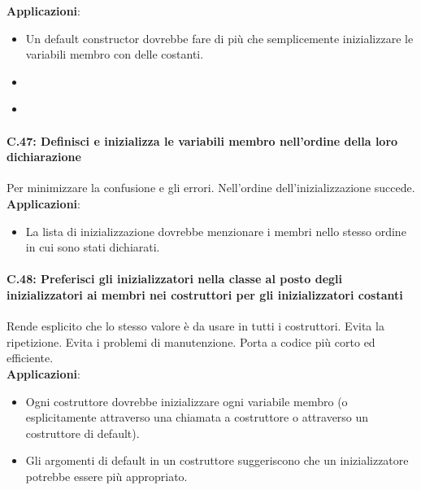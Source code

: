 \textsf{\small \textbf{Applicazioni}: }

\begin{itemize}
	\item \textsf{\small Un default constructor dovrebbe fare di più che semplicemente inizializzare le variabili membro con delle costanti.}
	\item \textsf{\small }
	\item \textsf{\small }
\end{itemize}

\paragraph{C.47: Definisci e inizializza le variabili membro nell'ordine della loro dichiarazione}

\textsf{\small Per minimizzare la confusione e gli errori. Nell'ordine dell'inizializzazione succede.} \\

\textsf{\small \textbf{Applicazioni}: }

\begin{itemize}
	\item \textsf{\small La lista di inizializzazione dovrebbe menzionare i membri nello stesso ordine in cui sono stati dichiarati.}
\end{itemize}

\paragraph{C.48: Preferisci gli inizializzatori nella classe al posto degli inizializzatori ai membri nei costruttori per gli inizializzatori costanti} %

\textsf{\small Rende esplicito che lo stesso valore è da usare in tutti i costruttori. Evita la ripetizione. Evita i problemi di manutenzione. Porta a codice più corto ed efficiente.} \\

\textsf{\small \textbf{Applicazioni}: }

\begin{itemize}
	\item \textsf{\small Ogni costruttore dovrebbe inizializzare ogni variabile membro (o esplicitamente attraverso una chiamata a costruttore o attraverso un costruttore di default).}
	\item \textsf{\small Gli argomenti di default in un costruttore suggeriscono che un inizializzatore potrebbe essere più appropriato.}
\end{itemize}

